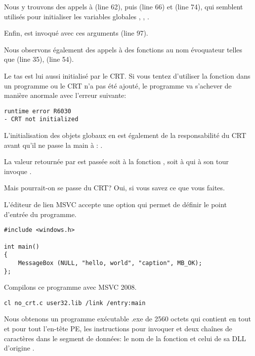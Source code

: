 Nous y trouvons des appels à  (line 62),
puis  (line 66) et  (line 74),
qui semblent utilisés pour initialiser les variables globales 
, , .

Enfin, \main{} est invoqué avec ces arguments (line 97).

Nous observons également des appels à des fonctions au nom évoquateur telles que  
(line 35),  (line 54).

Le tas  est lui aussi initialisé par le \ac{CRT}.
Si vous tentez d'utiliser la fonction  dans un programme ou le CRT n'a pas été ajouté, 
le programme va s'achever de manière anormale avec l'erreur suivante:

\begin{lstlisting}
runtime error R6030
- CRT not initialized
\end{lstlisting}

L'initialisation des objets globaux en \Cpp est également de la responsabilité du \ac{CRT} avant 
qu'il ne passe la main à \main{}: 
.

La valeur retournée par \main{} est passée soit à la fonction , soit à  qui 
à son tour invoque .

Mais pourrait-on se passe du \ac{CRT}?
Oui, si vous savez ce que vous faites.

L'éditeur de lien \ac{MSVC} accepte une option  qui permet de définir le point d'entrée 
du programme.

\begin{lstlisting}[style=customc]
#include <windows.h>

int main()
{
	MessageBox (NULL, "hello, world", "caption", MB_OK);
};
\end{lstlisting}

Compilons ce programme avec MSVC 2008.

\begin{lstlisting}
cl no_crt.c user32.lib /link /entry:main
\end{lstlisting}

Nous obtenons un programme exécutable .exe de 2560 octets qui contient en tout et pour tout l'en-tête 
PE, les  instructions pour invoquer  et deux chaînes de caractères dans le segment de 
données:  le nom de la fonction  et celui de sa DLL d'origine .

